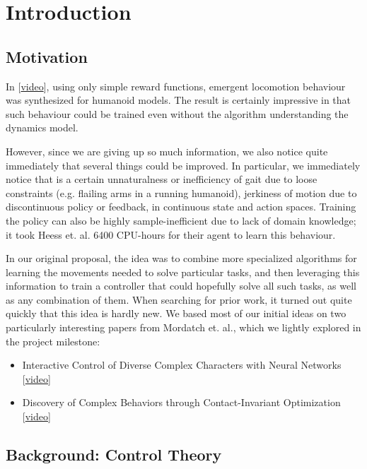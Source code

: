 \documentclass{article}
\begin{document}
\section{Introduction}
\subsection{Motivation}
In \cite{heess2017emergence} [\href{https://www.youtube.com/watch?v=hx_bgoTF7bs}{video}], using only simple reward functions, emergent locomotion behaviour was synthesized for humanoid models. The result is certainly impressive in that such behaviour could be trained even without the algorithm understanding the dynamics model.

However, since we are giving up so much information, we also notice quite immediately that several things could be improved. In particular, we immediately notice that is a certain unnaturalness or inefficiency of gait due to loose constraints (e.g. flailing arms in a running humanoid), jerkiness of motion due to discontinuous policy or feedback, in continuous state and action spaces. Training the policy can also be highly sample-inefficient due to lack of domain knowledge; it took Heess et. al. 6400 CPU-hours for their agent to learn this behaviour.

In our original proposal, the idea was to combine more specialized algorithms for learning the movements needed to solve particular tasks, and then leveraging this information to train a controller that could hopefully solve all such tasks, as well as any combination of them. When searching for prior work, it turned out quite quickly that this idea is hardly new. We based most of our initial ideas on two particularly interesting papers from Mordatch et. al., which we lightly explored in the project milestone:

\begin{itemize}
	\item Interactive Control of Diverse Complex Characters with Neural Networks \cite{mordatch2015interactive} [\href{https://www.youtube.com/watch?v=57D-qgVX-6o}{video}]
	\item Discovery of Complex Behaviors through Contact-Invariant Optimization \cite{mordatch2012discovery} [\href{https://www.youtube.com/watch?v=mhr_jtQrhVA}{video}]
\end{itemize}

\subsection{Background: Control Theory}
\end{document}
